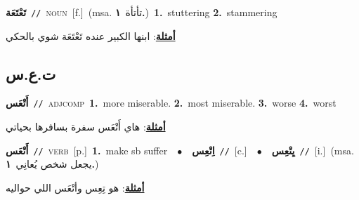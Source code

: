 \documentclass[10pt,a4paper,twoside]{article} %
\begin{document}
\begin{multicols}{2}
{\setlength\topsep{0pt}\textbf{\foreignlanguage{arabic}{تَعْتَعَة}}\ {\color{gray}\texttt{//}\color{black}}\ \textsc{noun}\ [f.]\ \color{gray}(msa. \foreignlanguage{arabic}{تأتأة}~\foreignlanguage{arabic}{\textbf{١.}})\color{black}\ \textbf{1.}~stuttering  \textbf{2.}~stammering\  \begin{flushright}\color{gray}\foreignlanguage{arabic}{\textbf{\underline{\foreignlanguage{arabic}{أمثلة}}}: ابنها الكبير عنده تَعْتَعَة شوي بالحكي}\end{flushright}\color{black}} \vspace{2mm}

\vspace{-3mm}
\subsection*{\color{blue}\foreignlanguage{arabic}{ت.ع.س}\color{blue}{}} 

{\setlength\topsep{0pt}\textbf{\foreignlanguage{arabic}{أَتْعَس}}\ {\color{gray}\texttt{//}\color{black}}\ \textsc{adj\textunderscore comp}\ \textbf{1.}~more miserable.  \textbf{2.}~most miserable.  \textbf{3.}~worse  \textbf{4.}~worst\  \begin{flushright}\color{gray}\foreignlanguage{arabic}{\textbf{\underline{\foreignlanguage{arabic}{أمثلة}}}: هاي أَتْعَس سفرة بسافرها بحياتي}\end{flushright}\color{black}} \vspace{2mm}

{\setlength\topsep{0pt}\textbf{\foreignlanguage{arabic}{أَتْعَس}}\ {\color{gray}\texttt{//}\color{black}}\ \textsc{verb}\ [p.]\ \textbf{1.}~make sb suffer\ \ $\bullet$\ \ \setlength\topsep{0pt}\textbf{\foreignlanguage{arabic}{اِتْعِس}}\ {\color{gray}\texttt{//}\color{black}}\ [c.]\ \ $\bullet$\ \ \setlength\topsep{0pt}\textbf{\foreignlanguage{arabic}{يِتْعِس}}\ {\color{gray}\texttt{//}\color{black}}\ [i.]\ \color{gray}(msa. \foreignlanguage{arabic}{يجعل شخص يُعانِي}~\foreignlanguage{arabic}{\textbf{١.}})\color{black}\  \begin{flushright}\color{gray}\foreignlanguage{arabic}{\textbf{\underline{\foreignlanguage{arabic}{أمثلة}}}: هو تِعِس وأتْعَس اللي حواليه}\end{flushright}\color{black}} \vspace{2mm}


\end{multicols}
\end{document}

